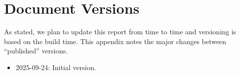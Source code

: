 \section{Document Versions}
\label{app:versions}

As stated, we plan to update this report from time to time and versioning
is based on the build time. This appendix notes the major changes between
``published'' versions.

\begin{itemize}

\item 2025-09-24: Initial version.

\end{itemize}
